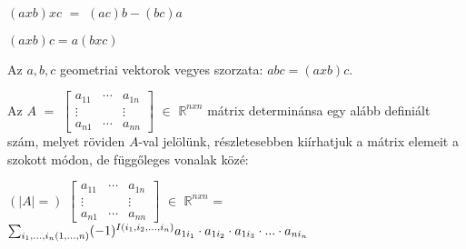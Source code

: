 	\begin{frame}
		\begin{tcolorbox}[title={Tétel.: Kifejtési tétel}]
			$(a x b) x c$ $=$ $(ac)b - (bc)a$
		\end{tcolorbox}	
		
		\begin{tcolorbox}[title={Tétel.: Felcserélési tétel}]
			$(a x b)c = a(b x c)$
		\end{tcolorbox}	
		
		\begin{tcolorbox}[title={Def.: Vegyesszorzat}]
			Az $a, b, c$ geometriai vektorok vegyes szorzata: $abc = (a x b)c$.
		\end{tcolorbox}	
		
		\begin{tcolorbox}[title={Def.: Determináns}]
			Az $A$ $=$ $\begin{bmatrix} 
  				a_{11} & \cdots & a_{1n}  \\
  				\vdots &   & \vdots \\
  				a_{n1} & \cdots & a_{nn}
			\end{bmatrix}$ $\in$ $\mathbb{R}^{n x n}$ mátrix determinánsa egy alább definiált szám, melyet röviden $A$-val jelölünk, részletesebben kiírhatjuk a mátrix elemeit a szokott módon, de függőleges vonalak közé:\\
			\mmedskip
			
			$(|A| = )$ $\begin{bmatrix} 
  				a_{11} & \cdots & a_{1n} \\
  				\vdots &   & \vdots\\
  				a_{n1} & \cdots & a_{nn}
			\end{bmatrix}$ $\in$ $\mathbb{R}^{n x n}$ = $\sum_{i_1, ..., i_n\\ (1, ..., n)} (-1)^{I(i_1, i_2, ..., i_n)} a_{1i_1} \cdot a_{1i_2} \cdot a_{1i_3} \cdot ... \cdot a_{ni_n}$
		\end{tcolorbox}	
		
	\end{frame}
	
	
	
	
	
	
	
	
	
	
	
	
	
	
	
	
	
	
	
	
	
	
	
